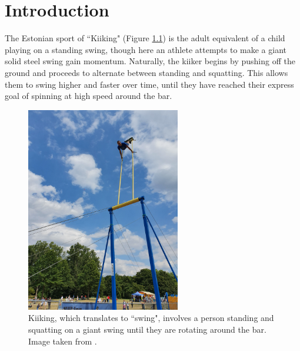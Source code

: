 

\chapter{Introduction}

The Estonian sport of ``Kiiking" (Figure \ref{fig:kiiking}) is the adult
equivalent of a child playing on a standing swing, though here
an athlete attempts to make a giant solid steel swing gain momentum.
Naturally, the kiiker begins by pushing off the ground and proceeds to alternate
between standing and squatting. 
This allows them to swing higher and faster over time, until they have reached
their express goal of spinning at high speed around the bar.

\begin{figure}[h]
    \centering
    \includegraphics[width=0.6\textwidth,angle=270]{images/kiiking.jpg}
    \caption{Kiiking, which translates to ``swing", involves a person standing
        and squatting on a giant swing until they are rotating around the bar.
    Image taken from \cite{kiiking-img}.}
    \label{fig:kiiking}
\end{figure}


